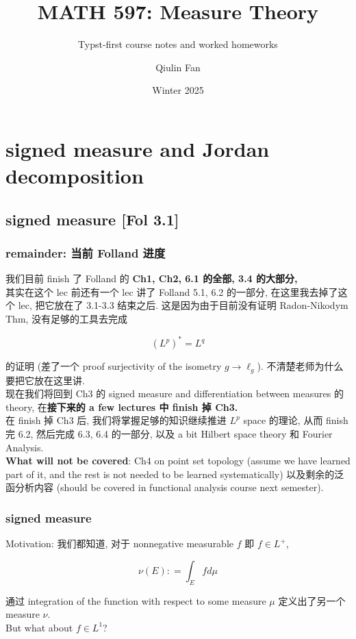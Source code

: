 \documentclass{qlnotes-export}
\title{MATH 597: Measure Theory}
\subtitle{Typst-first course notes and worked homeworks}
\author{Qiulin Fan}
\date{Winter 2025}
\begin{document}
\mainmatter
\chapter{signed measure and Jordan decomposition}\label{signed-measure-and-jordan-decomposition}

\section{signed measure {[}Fol 3.1{]}}

\subsection{remainder: 当前 Folland 进度}\label{remainder-ux5f53ux524d-folland-ux8fdbux5ea6}

我们目前 finish 了 Folland 的 \textbf{Ch1, Ch2, 6.1 的全部, 3.4 的大部分,}\\
其实在这个 lec 前还有一个 lec 讲了 Folland 5.1, 6.2 的一部分, 在这里我去掉了这个 lec, 把它放在了 3.1-3.3 结束之后. 这是因为由于目前没有证明 Radon-Nikodym Thm, 没有足够的工具去完成

\[(L^{p})^{\ast} = L^{q}\]

的证明 (差了一个 proof surjectivity of the isometry \(g\rightarrow\ell_{g}\)). 不清楚老师为什么要把它放在这里讲.\\
现在我们将回到 Ch3 的 signed measure and differentiation between measures 的 theory, 在\textbf{接下来的 a few lectures 中 finish 掉 Ch3.}\\
在 finish 掉 Ch3 后, 我们将掌握足够的知识继续推进 \(L^{p}\) space 的理论, 从而 finish 完 6.2, 然后完成 6.3, 6.4 的一部分, 以及 a bit Hilbert space theory 和 Fourier Analysis.\\
\textbf{What will not be covered}: Ch4 on point set topology (assume we have learned part of it, and the rest is not needed to be learned systematically) 以及剩余的泛函分析内容 (should be covered in functional analysis course next semester).

\subsection{signed measure}\label{signed-measure}

Motivation: 我们都知道, 对于 nonnegative measurable \(f\) 即 \(f \in L^{+}\),

\[\nu(E): = \int_{E}f d\mu\]

通过 integration of the function with respect to some measure \(\mu\) 定义出了另一个 measure \(\nu\).\\
But what about \(f \in L^{1}\)?
\end{document}
